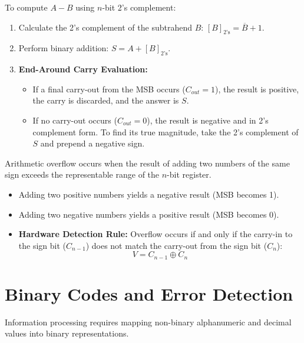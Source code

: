 \begin{conceptbox}
To compute $A - B$ using $n$-bit 2's complement:
\begin{enumerate}
    \item Calculate the 2's complement of the subtrahend $B$: $[B]_{\text{2's}} = \overline{B} + 1$.
    \item Perform binary addition: $S = A + [B]_{\text{2's}}$.
    \item \textbf{End-Around Carry Evaluation:}
    \begin{itemize}
        \item If a final carry-out from the MSB occurs ($C_{out} = 1$), the result is positive, the carry is discarded, and the answer is $S$.
        \item If no carry-out occurs ($C_{out} = 0$), the result is negative and in 2's complement form. To find its true magnitude, take the 2's complement of $S$ and prepend a negative sign.
    \end{itemize}
\end{enumerate}
\end{conceptbox}

\begin{pitfallbox}
Arithmetic overflow occurs when the result of adding two numbers of the same sign exceeds the representable range of the $n$-bit register.
\begin{itemize}
    \item Adding two positive numbers yields a negative result (MSB becomes 1).
    \item Adding two negative numbers yields a positive result (MSB becomes 0).
    \item \textbf{Hardware Detection Rule:} Overflow occurs if and only if the carry-in to the sign bit ($C_{n-1}$) does not match the carry-out from the sign bit ($C_n$):
    \begin{equation}
    V = C_{n-1} \oplus C_n
    \end{equation}
\end{itemize}
\end{pitfallbox}

\section{Binary Codes and Error Detection}
Information processing requires mapping non-binary alphanumeric and decimal values into binary representations.

